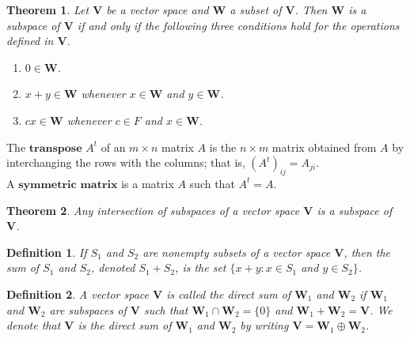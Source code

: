 \documentclass[11pt]{article}
\newtheorem {thm}{Theorem}
\newtheorem{definition}{Definition}
\begin{document}
\begin{comment}
The four properties must hold:
\begin{enumerate}
	\item $x+y \in \textbf{W}$ whenever $x \in \textbf{W}$ and $y \in \textbf{W}$. ($\textbf{W}$ is closed under addition.)
	\item $cx \in \textbf{W}$ whenever $c \in F$ and $x \in \textbf{W}$. ($\textbf{W}$ is closed under scalar multiplication.)
	\item $\textbf{W}$ has a zero vector.
	\item Each vector in $\textbf{W}$ has an additive inverse in $\textbf{W}$.
\end{enumerate}
\end{comment}

\begin{thm}
Let $\textbf{V}$ be a vector space and $\textbf{W}$ a subset of $\textbf{V}$. Then $\textbf{W}$ is a subspace of $\textbf{V}$ if and only if the following three conditions hold for the operations defined in $\textbf{V}$.
\begin{enumerate}[label=(\alph*)]
	\item $0 \in \textbf{W}$.
	\item $x + y \in \textbf{W}$ whenever $x \in \textbf{W}$ and $y \in \textbf{W}$.
	\item $cx \in \textbf{W}$ whenever $c \in F$ and $x \in \textbf{W}$.
\end{enumerate}
\end{thm}

The $\textbf{transpose}$ $A^t$ of an $m \times n$ matrix $A$ is the $n \times m$ matrix obtained from $A$ by interchanging the rows with the columns; that is, $(A^t)_{ij} = A_{ji}$.\\
A $\textbf{symmetric matrix}$ is a matrix $A$ such that $A^t = A$.

\begin{thm}
Any intersection of subspaces of a vector space $\textbf{V}$ is a subspace of $\textbf{V}$.
\end{thm}

\begin{definition}
If $S_1$ and $S_2$ are nonempty subsets of a vector space $\textbf{V}$, then the sum of $S_1$ and $S_2$, denoted $S_1 + S_2$, is the set $\{x+y: x \in S_1$ and $y \in S_2\}$.
\end{definition}

\begin{definition}
A vector space $\textbf{V}$ is called the direct sum of $\textbf{W}_1$ and $\textbf{W}_2$ if $\textbf{W}_1$ and $\textbf{W}_2$ are subspaces of $\textbf{V}$ such that $\textbf{W}_1 \cap \textbf{W}_2 = \{0\}$ and $\textbf{W}_1 + \textbf{W}_2 = \textbf{V}$. We denote that $\textbf{V}$ is the direct sum of $\textbf{W}_1$ and $\textbf{W}_2$ by writing $\textbf{V} = \textbf{W}_1 \oplus \textbf{W}_2$.
\end{definition}
\end{document}
